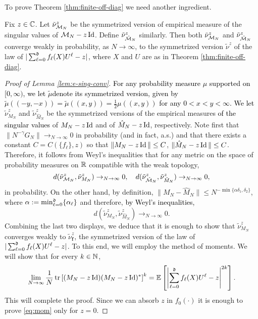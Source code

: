 \documentclass{amsart}
\numberwithin{equation}{section}
\def\corABrev{\textcolor{black}}
\begin{document}
To prove Theorem \ref{thm:finite-off-diag} we need another ingredient.
\begin{lemma}\label{lem:e-sing-conv}
Fix $z \in \mathbb{C}$. Let $\tilde{\nu}_{\mathcal{M}_N}^z$ be the
symmetrized version of empirical measure of
the singular values of $\mathcal{M}_N - z \operatorname{Id}$.
Define $\tilde{\nu}_{\hat{\mathcal{M}}_N}^z$ similarly.
Then both $\tilde{\nu}_{\mathcal{M}_N}^z$ and $\tilde{\nu}_{\hat{\mathcal{M}}_N}^z$
converge weakly in probability, as $N\to\infty$,
to the symmetrized version $\tilde \nu^z$ of the law of
$|\sum_{\ell=0}^{\mathfrak{d}} f_\ell(X) U^\ell -z|$, where $X$ and $U$ are as in  Theorem \ref{thm:finite-off-diag}.
\end{lemma}
\begin{proof}[Proof of Lemma \ref{lem:e-sing-conv}]
  \corABrev{For any probability measure $\mu$ supported on $[0,\infty)$, we let $\tilde \mu$denote  its symmetrized version, given by $\tilde \mu((-y,-x)) = \tilde \mu((x,y)) = \frac{1}{2}\mu((x,y))$ for any $ 0 < x < y < \infty$. We let} $\tilde \nu^z_{M_N}$ and
  $\tilde \nu^z_{\hat M_N}$  be the symmetrized versions of 
  the empirical measures \corABrev{of the singular values} of $M_N-z\operatorname{Id}$ and of $\hat M_N-z\operatorname{Id}$, respectively.
  Note first that
$\|N^{-\gamma} G_N\|\to_{N\to\infty} 0$ in probability (and in fact,
a.s.) and that there exists a constant $C=C(\{f_\ell\}, z)$ so that
$\|M_N-z\operatorname{Id}\|\leq C$,
$\|\hat M_N-z\operatorname{Id}\|\leq C$. Therefore,
it follows from Weyl's inequalities that
for any metric on the space of probability measures on $\mathbb{R}$
compatible with the weak topology,
$$d(\tilde \nu^z_{\mathcal{M}_N},\tilde \nu^z_{M_N})\to_{N\to\infty} 0,
\quad
d(\tilde \nu^z_{\hat {\mathcal{M}}_N},\tilde \nu^z_{\hat M_N})\to_{N\to\infty} 0,$$
in probability.
On the other hand,
by definition,
$\|M_N -\hat{M}_N\| \le N^{-\min\{\alpha \delta_1, \delta_2\}}$,
where $\alpha:=\min_{\ell=0}^{\mathfrak{d}}\{\alpha_\ell\}$ and therefore, \corABrev{by
Weyl's inequalities,}
$$d(\tilde \nu^z_{M_N},\tilde \nu^z_{\hat M_N})\to_{N\to\infty} 0.$$
Combining the last two displays, we deduce
that it is enough to show that $\tilde{\nu}_{M_N}^z$ converges
weakly to $\tilde\nu^z_{\bm f}$, the symmetrized version of the law of
$|\sum_{\ell=0}^{\mathfrak{d}} f_\ell(X) U^\ell -z|$.
To this end, we will employ the method of moments.
We will show that for every $k \in \mathbb N$,
\begin{equation}\label{eq:mom}
\lim_{N \to \infty} \frac{1}{N} \operatorname{tr} \left[ (M_N - z\operatorname{Id})(M_N - z\operatorname{Id})^*\right]^k = \mathbb E \left[ \left|\sum_{\ell=0}^{\mathfrak{d}} f_\ell(X) U^\ell -z\right|^{2k}\right].
\end{equation}
This will complete the proof.
Since we can absorb $z$ in $f_0(\cdot)$ it is enough to prove \eqref{eq:mom} only for $z =0$.


\end{proof}
\end{document}
